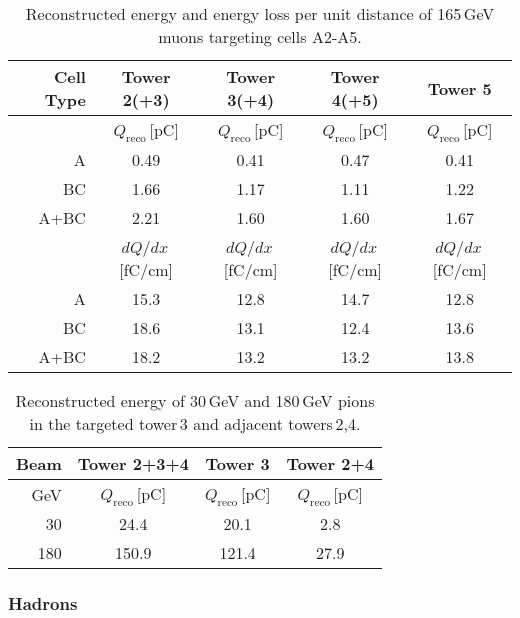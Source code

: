 \begin{table}[h]
\begin{center}{\small
\begin{tabular}{ r c c c c  }
{\bfseries Cell Type} & {\bfseries Tower 2(+3)} & {\bfseries Tower 3(+4)} & {\bfseries Tower 4(+5)} & {\bfseries Tower 5}\\
\toprule
          & $Q_\text{reco}$\,[pC] & $Q_\text{reco}$\,[pC] & $Q_\text{reco}$\,[pC] & $Q_\text{reco}$\,[pC]\\
A         &     0.49 &  0.41 & 0.47 & 0.41\\
BC        &     1.66 &  1.17 & 1.11 & 1.22\\ 
A+BC      &     2.21 &  1.60 & 1.60 & 1.67\\
\midrule
          &   $dQ/dx$\,[fC/cm] & $dQ/dx$\,[fC/cm] & $dQ/dx$\,[fC/cm] & $dQ/dx$\,[fC/cm]\\
A         &   15.3 & 12.8 & 14.7 & 12.8\\
BC        &   18.6 & 13.1 & 12.4 & 13.6\\ 
A+BC      &   18.2 & 13.2 & 13.2 & 13.8\\ 
\bottomrule
\end{tabular}}
\end{center}
\caption{\label{tab:muons}Reconstructed energy and energy loss per unit distance of 165\,GeV muons targeting cells A2-A5.}
\end{table}

\begin{table}[h]
  \begin{center}{\small
  \begin{tabular}{ r c c c }
  {\bfseries Beam} & {\bfseries Tower 2+3+4} & {\bfseries Tower 3} & {\bfseries Tower 2+4}\\
  \toprule
  GeV   & $Q_\text{reco}$\,[pC] & $Q_\text{reco}$\,[pC] & $Q_\text{reco}$\,[pC]\\
   30   &     24.4 &   20.1 &  2.8\\
  180   &    150.9 &  121.4 & 27.9\\ 
  \bottomrule
  \end{tabular}}
  \end{center}
  \caption{\label{tab:hadrons}Reconstructed energy of 30\,GeV and 180\,GeV pions in the targeted tower\,3 and adjacent towers\,2,4.}
\end{table}

\subsubsection*{Hadrons}

